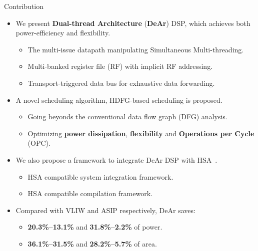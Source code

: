 \documentclass{beamer}
\begin{document}
\begin{CJK}{UTF8}{bkai}
    \begin{frame}{Contribution}
        \begin{itemize}
            \item {
                    We present \textbf{Dual-thread Architecture} (\textbf{DeAr}) DSP, which achieves both power-efficiency and flexibility.
                    \begin{itemize}
                        \item {
                                The multi-issue datapath manipulating Simultaneous Multi-threading.
                            }
                        \item {
                                Multi-banked register file (RF) with implicit RF addressing.
                            }
                        \item {
                                Transport-triggered data bus for exhaustive data forwarding.
                            }
                        \end{itemize}
                }
            \item {
                    A novel scheduling algorithm, HDFG-based scheduling is proposed.
                    \begin{itemize}
                        \item Going beyonds the conventional data flow graph (DFG) analysis.
                        \item Optimizing \textbf{power dissipation}, \textbf{flexibility} and \textbf{Operations per Cycle} (OPC).
                    \end{itemize}
                }
            \item {
                    We also propose a framework to integrate DeAr DSP with HSA~\cite{systemspec}.
                    \begin{itemize}
                        \item {
                                HSA compatible system integration framework.
                            }
                        \item {
                                HSA compatible compilation framework.
                            }
                        \end{itemize}
                }
            \item{
                    Compared with VLIW and ASIP respectively, DeAr saves: 
                    \begin{itemize}
                        \item {
                                \textbf{20.3\%--13.1\%} and \textbf{31.8\%--2.2\%} of power.
                            }
                        \item {
                                \textbf{36.1\%--31.5\%} and \textbf{28.2\%--5.7\%} of area.
                            }
                        \end{itemize}
                }
        \end{itemize}
    \end{frame}


\end{CJK}
\end{document}
